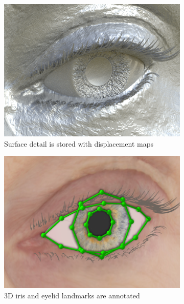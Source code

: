\begin{figure}
\begin{subfigure}[t]{0.195\textwidth}
        \includegraphics[width=\textwidth]{process_f02_03}
        \caption{Surface detail is stored with displacement maps}
        \label{fig:process_displaced_subdiv}
    \end{subfigure}
    \hfill
    \begin{subfigure}[t]{0.195\textwidth}
        \includegraphics[width=\textwidth]{process_f02_04}
        \caption{3D iris and eyelid landmarks are annotated}
        \label{fig:process_ldmks}
    \end{subfigure}
    \hfill
    \begin{subfigure}[t]{0.195\textwidth}

\end{subfigure}
\end{figure}

